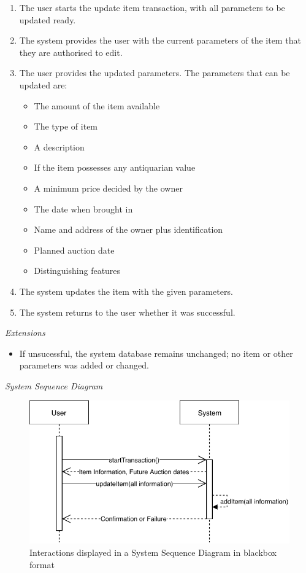 \begin{enumerate}[noitemsep]
	\item The user starts the update item transaction, with all parameters to be updated ready.
	\item The system provides the user with the current parameters of the item that they are authorised to edit.
	\item The user provides the updated parameters. The parameters that can be updated are:
	\begin{itemize}[noitemsep]
		\item The amount of the item available
		\item The type of item
		\item A description
		\item If the item possesses any antiquarian value
		\item A minimum price decided by the owner
		\item The date when brought in
		\item Name and address of the owner plus identification
		\item Planned auction date
		\item Distinguishing features
	\end{itemize}
	\item The system updates the item with the given parameters.
	\item The system returns to the user whether it was successful.
\end{enumerate}
\textsl{Extensions}
\begin{itemize}[noitemsep]
	\item If unsucessful, the system database remains unchanged; no item or other parameters was added or changed.
\end{itemize}
\textsl{System Sequence Diagram}
\begin{figure}[H]
	\centering
	\includegraphics[scale=1]{SD-bb-update.pdf}
	\caption*{Interactions displayed in a System Sequence Diagram in blackbox format}
\end{figure}